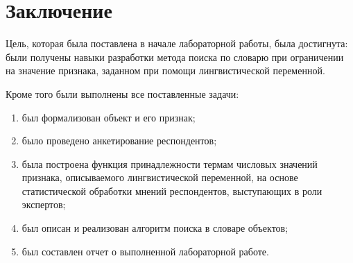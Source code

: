 \chapter*{Заключение}

Цель, которая была поставлена в начале лабораторной работы, была достигнута: были получены навыки разработки метода поиска по словарю при ограничении на значение признака, заданном при помощи лингвистической переменной.

Кроме того были выполнены все поставленные задачи:
\begin{enumerate}
	\item был формализован объект и его признак;
	\item было проведено анкетирование респондентов;
	\item была построена функция принадлежности термам числовых значений признака, описываемого лингвистической переменной, на основе статистической обработки мнений респондентов, выступающих в роли экспертов;
	\item был описан и реализован алгоритм поиска в словаре объектов;
	\item был составлен отчет о выполненной лабораторной работе.
\end{enumerate}
